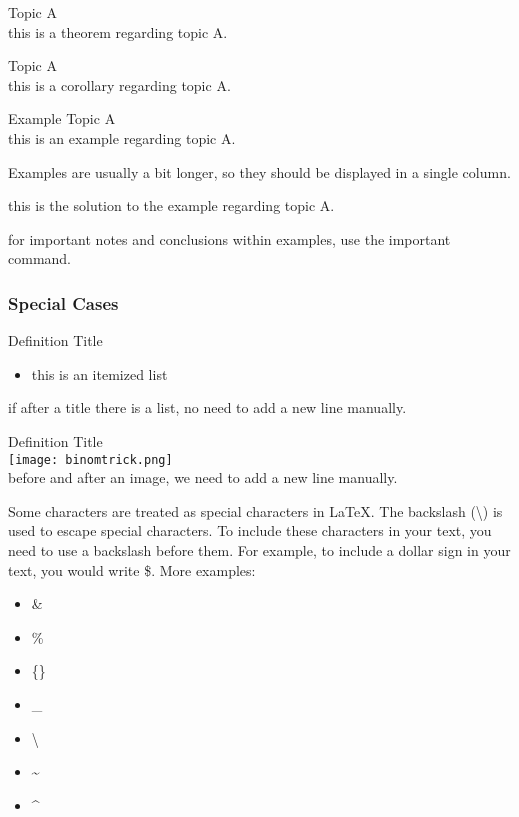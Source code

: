 \begin{theorem}{Topic A}\\
    this is a theorem regarding topic A.
\end{theorem}

\begin{corollary}{Topic A}\\
    this is a corollary regarding topic A.
\end{corollary}

\multend

\begin{example2}{Example Topic A}\\
    this is an example regarding topic A.

    Examples are usually a bit longer, so they should be displayed in a single column.

    \tcblower

    this is the solution to the example regarding topic A.

     for important notes and conclusions within examples, use the important command.
\end{example2}

\subsubsection{Special Cases}

\begin{definition}{Definition Title}
    \begin{itemize}
        \item this is an itemized list
    \end{itemize}
    if after a title there is a list, no need to add a new line manually.
\end{definition}

\begin{definition}{Definition Title}
    \\
    \texttt{[image: binomtrick.png]}
    \\
    before and after an image, we need to add a new line manually. 
\end{definition}

\begin{remark}
    Some characters are treated as special characters in LaTeX. The backslash (\textbackslash) is used to escape special characters. 
    To include these characters in your text, you need to use a backslash before them. 
    For example, to include a dollar sign in your text, you would write \$.
    More examples:
    \begin{itemize}
        \item \&
        \item \%
        \item \{\}
        \item \_
        \item \textbackslash
        \item \textasciitilde
        \item \textasciicircum
    \end{itemize}
\end{remark}

